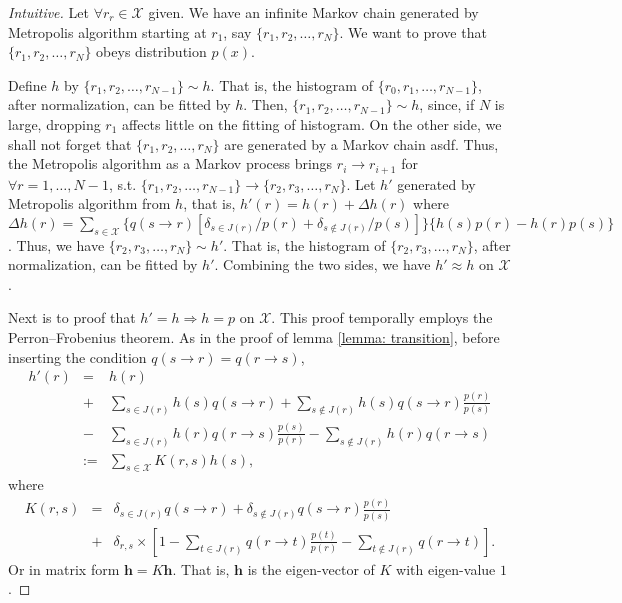 \documentclass{article}
\newcommand{\assign}{:=}
\newcommand{\nin}{\not\in}
\newcommand{\tmmathbf}[1]{\ensuremath{\boldsymbol{#1}}}
\begin{document}
\begin{proof}
  [Intuitive]
  
  Let $\forall r_{r} \in \mathcal{X}$ given. We have an infinite Markov chain
  generated by Metropolis algorithm starting at $r_{1}$, say $\{ r_{1} ,r_{2}
  , \ldots ,r_{N} \}$. We want to prove that $\{ r_{1} ,r_{2} , \ldots ,r_{N}
  \}$ obeys distribution $p ( x )$.
  
  Define $h$ by $\{ r_{1} ,r_{2} , \ldots ,r_{N-1} \} \sim h$. That is, the
  histogram of $\{ r_{0} ,r_{1} , \ldots ,r_{N-1} \}$, after normalization,
  can be fitted by $h$. Then, $\{ r_{1} ,r_{2} , \ldots ,r_{N-1} \} \sim h$,
  since, if $N$ is large, dropping $r_{1}$ affects little on the fitting of
  histogram. On the other side, we shall not forget that $\{ r_{1} ,r_{2} ,
  \ldots ,r_{N} \}$ are generated by a Markov chain asdf. Thus, the Metropolis
  algorithm as a Markov process brings $r_{i} \rightarrow r_{i+1}$ for
  $\forall r=1, \ldots ,N-1$, s.t. $\{ r_{1} ,r_{2} , \ldots ,r_{N-1} \}
  \rightarrow \{ r_{2} ,r_{3} , \ldots ,r_{N} \}$. Let $h'$ generated by
  Metropolis algorithm from $h$, that is, $h' ( r ) =h ( r ) + \Delta h ( r )$
  where $\Delta h ( r ) = \sum_{s \in \mathcal{X}} \{ q ( s \rightarrow r ) [ 
  \delta_{s \in J ( r )} /p ( r ) + \delta_{s \nin J ( r )} /p ( s ) ] \}  
  \{ h ( s )  p ( r ) -h ( r )  p ( s ) \}$. Thus, we have $\{ r_{2} ,r_{3} ,
  \ldots ,r_{N} \} \sim h'$. That is, the histogram of $\{ r_{2} ,r_{3} ,
  \ldots ,r_{N} \}$, after normalization, can be fitted by $h'$. Combining the
  two sides, we have $h' \approx h$ on $\mathcal{X}$.
  
  Next is to proof that $h' =h \Rightarrow h=p$ on $\mathcal{X}$. This proof
  temporally employs the Perron--Frobenius theorem. As in the proof of lemma
  \ref{lemma: transition}, before inserting the condition $q ( s \rightarrow r
  ) =q ( r \rightarrow s )$,
  \begin{eqnarray*}
    h' ( r ) & = & h ( r )\\
    & + & \sum_{s \in J ( r )}  h ( s )  q ( s \rightarrow r ) + \sum_{s \nin
    J ( r )}  h ( s )  q ( s \rightarrow r )   \frac{p ( r )}{p ( s )}\\
    & - & \sum_{s \in J ( r )}  h ( r )  q ( r \rightarrow s )   \frac{p ( s
    )}{p ( r )} - \sum_{s \nin J ( r )}  h ( r )  q ( r \rightarrow s )\\
    & \assign & \sum_{s \in \mathcal{X}}  K ( r,s )  h ( s ) ,
  \end{eqnarray*}
  where
  \begin{eqnarray*}
    K ( r,s ) & = & \delta_{s \in J ( r )}  q ( s \rightarrow r ) + \delta_{s
    \nin J ( r )}  q ( s \rightarrow r )   \frac{p ( r )}{p ( s )}  \\
    & + & \delta_{r,s} \times \left[ 1- \sum_{t \in J ( r )}  q ( r
    \rightarrow t )   \frac{p ( t )}{p ( r )} - \sum_{t \nin J ( r )} q ( r
    \rightarrow t ) \right] .
  \end{eqnarray*}
  Or in matrix form $\tmmathbf{h}=K \tmmathbf{h}$. That is, $\tmmathbf{h}$ is
  the eigen-vector of $K$ with eigen-value $1$.
  

\end{proof}
\end{document}

